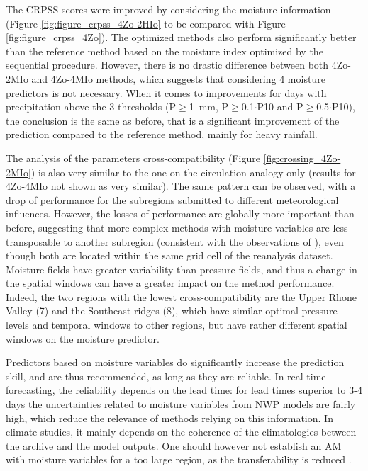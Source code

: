 \documentclass[review]{elsarticle}
\begin{document}
The CRPSS scores were improved by considering the moisture information (Figure \ref{fig:figure_crpss_4Zo-2HIo} to be compared with Figure \ref{fig:figure_crpss_4Zo}). The optimized methods also perform significantly better than the reference method based on the moisture index optimized by the sequential procedure. However, there is no drastic difference between both 4Zo-2MIo and 4Zo-4MIo methods, which suggests that considering 4 moisture predictors is not necessary. When it comes to improvements for days with precipitation above the 3 thresholds (P\(\geq\)1~mm, P\(\geq\)0.1\(\cdot\)P10 and P\(\geq\)0.5\(\cdot\)P10), the conclusion is the same as before, that is a significant improvement of the prediction compared to the reference method, mainly for heavy rainfall.

The analysis of the parameters cross-compatibility (Figure \ref{fig:crossing_4Zo-2MIo}) is also very similar to the one on the circulation analogy only (results for 4Zo-4MIo not shown as very similar). The same pattern can be observed, with a drop of performance for the subregions submitted to different meteorological influences. However, the losses of performance are globally more important than before, suggesting that more complex methods with moisture variables are less transposable to another subregion (consistent with the observations of \citet{Chardon2014}), even though both are located within the same grid cell of the reanalysis dataset. Moisture fields have greater variability than pressure fields, and thus a change in the spatial windows can have a greater impact on the method performance. Indeed, the two regions with the lowest cross-compatibility are the Upper Rhone Valley (7) and the Southeast ridges (8), which have similar optimal pressure levels and temporal windows to other regions, but have rather different spatial windows on the moisture predictor.

Predictors based on moisture variables do significantly increase the prediction skill, and are thus recommended, as long as they are reliable. In real-time forecasting, the reliability depends on the lead time: for lead times superior to 3-4 days the uncertainties related to moisture variables from NWP models are fairly high, which reduce the relevance of methods relying on this information. In climate studies, it mainly depends on the coherence of the climatologies between the archive and the model outputs. One should however not establish an AM with moisture variables for a too large region, as the transferability is reduced \citep[see also][]{Chardon2014}.
\end{document}
